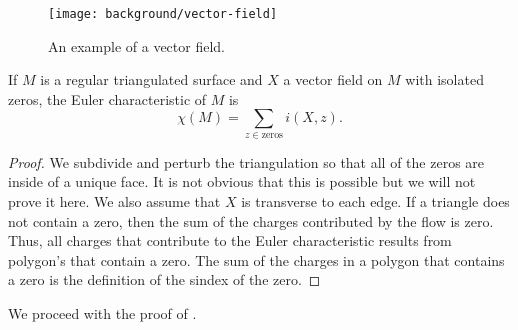 \begin{figure}[htb]
         \centering
         \texttt{[image: background/vector-field]}
	\caption{An example of a vector field.
	\label{fig:vector-field}}
 \end{figure}
 

\begin{theorem} \label{thm:poincare-index}

If $M$ is a regular triangulated surface and $X$ a vector field on $M$ with isolated zeros,
the Euler characteristic of $M$ is 
$$\chi(M)=\sum_{z\in \text{zeros}}i(X,z).$$
\end{theorem}

\begin{proof}
We subdivide and perturb the triangulation so that all of the zeros are inside of a unique face.
It is not obvious that this is possible but we will not prove it here.
We also assume that $X$ is transverse to each edge.
If a triangle does not contain a zero, then the sum of the charges
contributed by the flow is zero.
Thus, all charges that contribute to the Euler characteristic
results from polygon's that contain a zero.
The sum of the charges in a polygon that contains a zero is the definition of the sindex
of the zero.

\end{proof}

We proceed with the proof of . 

